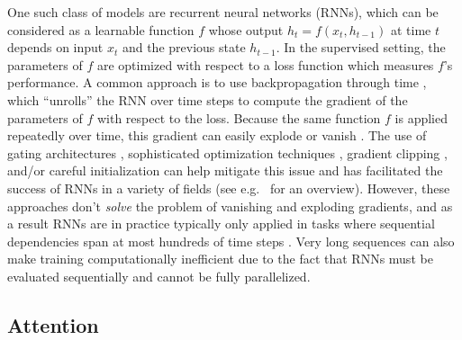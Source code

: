 \documentclass{article} %
\begin{document}
One such class of models are recurrent neural networks (RNNs), which can be considered as a learnable function $f$ whose output $h_t = f(x_t, h_{t - 1})$ at time $t$ depends on input $x_t$ and the previous state $h_{t - 1}$.
In the supervised setting, the parameters of $f$ are optimized with respect to a loss function which measures $f$'s performance.
A common approach is to use backpropagation through time \cite{werbos1990backpropagation}, which ``unrolls'' the RNN over time steps to compute the gradient of the parameters of $f$ with respect to the loss.
Because the same function $f$ is applied repeatedly over time, this gradient can easily explode or vanish \cite{pascanu2012difficulty,hochreiter1997long,bengio1994learning}.
The use of gating architectures \cite{hochreiter1997long,cho2014learning}, sophisticated optimization techniques \cite{martens2011learning,sutskever2013importance}, gradient clipping \cite{pascanu2012difficulty,graves2013generating}, and/or careful initialization \cite{sutskever2013importance,jaegar2012long,mikolov2014learning,le2015simple} can help mitigate this issue and has facilitated the success of RNNs in a variety of fields (see e.g.\ \cite{graves2012supervised,cho2015describing} for an overview).
However, these approaches don't \textit{solve} the problem of vanishing and exploding gradients, and as a result RNNs are in practice typically only applied in tasks where sequential dependencies span at most hundreds of time steps \cite{martens2011learning,sutskever2013importance,le2015simple,hochreiter1997long}.
Very long sequences can also make training computationally inefficient due to the fact that RNNs must be evaluated sequentially and cannot be fully parallelized.

\subsection{Attention}
\end{document}
